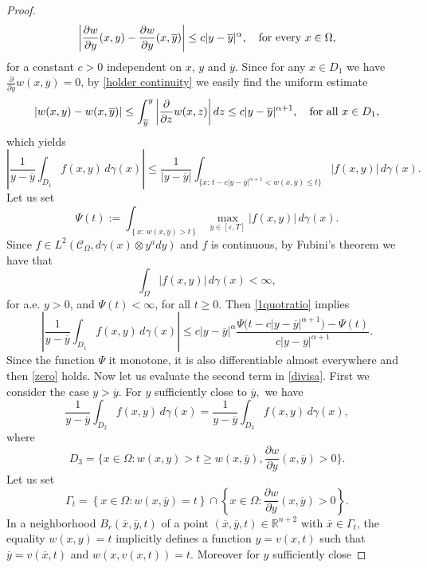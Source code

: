 \documentclass[a4paper,10pt,reqno]{amsart}
\newcommand{\R}{\mathbb{R}}
\numberwithin{equation}{section}
\begin{document}
\begin{proof}
\begin{equation}
\left\vert \frac{\partial w}{\partial y}(x,y)-\frac{\partial w}{\partial
y}(x,\overline{y})\right\vert \leq c|y-\overline{y}|^{\alpha},\quad\hbox{for every}~x\in\Omega,
\label{holder continuity}%
\end{equation}
for a constant $c>0$ independent on $x$, $y$ and $\overline{y}$.
Since for any
$x\in D_{1}$ we have $\frac{\partial}{\partial y}w(x,\overline{y})=0$, by \eqref{holder continuity} we easily find the uniform estimate
\[
\left\vert w(x,y)-w(x,\overline{y})\right\vert\leq
\int_{\overline{y}}^{y}\left|\frac{\partial}{\partial
z}w(x,z)\right|dz \leq c|y-\overline{y}|^{\alpha+1},\quad\hbox{for all}~x\in D_{1},
\]
which yields
\begin{equation}\label{1quotratio}
\left\vert \frac{1}{y-\overline{y}}\int_{D_{1}}f(x,y)\,d\gamma(x)\right\vert
\leq\frac{1}{\left\vert
y-\overline{y}\right\vert }\int_{\{x:\,t-c|y-\overline{y}|^{\alpha+1}<w(x,\overline{y})\leq t\}}
|f(x,y)|\,d\gamma(x).
\end{equation}
Let us set
\[
\Psi(t):=\int_{\left\{x:\,w(x,\overline{y})>t\right\}}\max_{y\in[\varepsilon,T]}|f(x,y)|\,d\gamma(x).
\]
Since $f\in L^{2}(\mathcal{C}_{\Omega},d\gamma(x)\otimes y^ady)$
and $f$ is continuous, by Fubini's theorem we have that
$$\int_{\Omega}|f(x,y)|\,d\gamma(x)<\infty,$$
for a.e. $y>0$, and $\Psi(t)<\infty$, for all $t\geq0$. Then \eqref{1quotratio} implies
\[
\left\vert \frac{1}{y-\overline{y}}\int_{D_{1}}f(x,y)\,d\gamma(x)\right\vert
\leq c\left\vert y-\overline{y}\right\vert ^{\alpha}\frac{\Psi\big(t-c\left\vert y-\overline
{y}\right\vert ^{\alpha+1}\big)-\Psi(t)}{c\left\vert y-\overline{y}\right\vert ^{\alpha+1}}.
\]
Since the function $\Psi$ it monotone, it is also differentiable almost everywhere and then \eqref{zero} holds.
Now let us evaluate the second term in \eqref{divisa}.
First we consider the case $y>\overline{y}.$
For $y$ sufficiently close to $\overline{y},$ we have
$$\frac{1}{y-\overline{y}}\int_{D_{2}}f(x,y)\,d\gamma(x)=\frac{1}{y-\overline{y}}\int_{D_{3}}f(x,y)\,d\gamma(x),$$
where $$D_{3}=\bigg\{x\in\Omega:w(x,y)>t\geq w(x,\overline{y}),\frac
{\partial w}{\partial y}(x,\overline{y})>0\bigg\}.$$
Let us set
\[
\Gamma_{t}=\left\{x\in\Omega:w(x,\overline{y})=t\right\}  \cap\left\{
x\in\Omega:\frac{\partial w}{\partial y}(x,\overline{y})>0\right\}  .
\]
In a neighborhood $B_{r}(\overline{x},\overline{y},t)$ of a point
$(\overline{x},\overline{y},t)\in\R^{n+2}$ with $\overline{x}\in\Gamma_{t}$, the equality $w(x,y)=t$
implicitly defines a function $y=v(x,t)$ such that $\overline{y}%
=v(\overline{x},t)$ and $w(x,v(x,t))=t.$ Moreover for $y$ sufficiently close

\end{proof}
\end{document}
